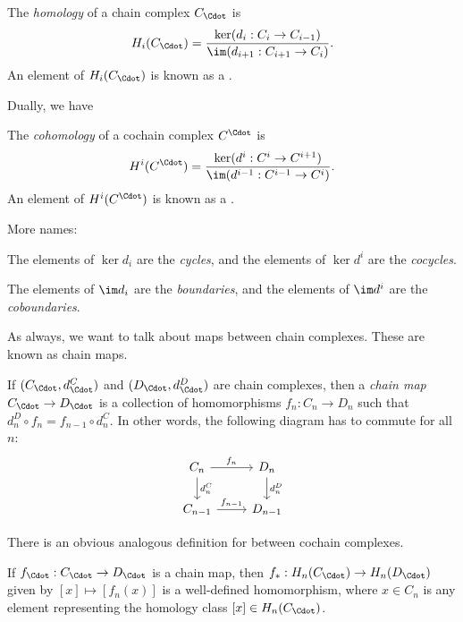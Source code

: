 \documentclass[a4paper]{article}
\theoremstyle{definition}
\begin{document}
\begin{defi}[Homology]
  The \emph{homology} of a chain complex $C_{\Cdot}$ is
  \[
    H_i(C_{\Cdot}) = \frac{\ker (d_i: C_i \to C_{i - 1})}{\im (d_{i + 1}: C_{i + 1} \to C_i)}.
  \]
  An element of $H_i(C_{\Cdot})$ is known as a .
\end{defi}

Dually, we have
\begin{defi}[Cohomology]
  The \emph{cohomology} of a cochain complex $C^{\Cdot}$ is
  \[
    H^i(C^{\Cdot}) = \frac{\ker (d^i: C^i \to C^{i + 1})}{\im (d^{i - 1}: C^{i - 1} \to C^i)}.
  \]
  An element of $H^i(C^{\Cdot})$ is known as a .
\end{defi}

More names:
\begin{defi}
  The elements of $\ker d_i$ are the \emph{cycles}, and the elements of $\ker d^i$ are the \emph{cocycles}.
\end{defi}

\begin{defi}
  The elements of $\im d_i$ are the \emph{boundaries}, and the elements of $\im d^i$ are the \emph{coboundaries}.
\end{defi}

As always, we want to talk about maps between chain complexes. These are known as chain maps.
\begin{defi}
  If $(C_{\Cdot}, d_{\Cdot}^C)$ and $(D_{\Cdot}, d_{\Cdot}^D)$ are chain complexes, then a \emph{chain map} $C_{\Cdot} \to D_{\Cdot}$ is a collection of homomorphisms $f_n: C_n \to D_n$ such that $d_n^D \circ f_n = f_{n - 1} \circ d_n^C$. In other words, the following diagram has to commute for all $n$:
  \[
    \begin{tikzcd}
      C_n \ar[r, "f_n"] \ar[d, "d_n^C"] & D_n \ar[d, "d_n^D"]\\
      C_{n - 1} \ar[r, "f_{n - 1}"] & D_{n - 1}
    \end{tikzcd}
  \]
\end{defi}
There is an obvious analogous definition for  between cochain complexes.

\begin{lemma}
  If $f_{\Cdot}: C_{\Cdot} \to D_{\Cdot}$ is a chain map, then $f_*: H_n(C_{\Cdot}) \to H_n(D_{\Cdot})$ given by $[x] \mapsto [f_n(x)]$ is a well-defined homomorphism, where $x \in C_n$ is any element representing the homology class $[x] \in H_n(C_{\Cdot})$.
\end{lemma}
\end{document}
